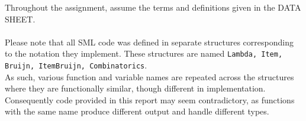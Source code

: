 \documentclass[11pt]{article}
\begin{document}
\maketitle


Throughout the assignment, assume the terms and definitions given in the DATA SHEET.
\\
\\
Please note that all SML code was defined in separate structures corresponding to the notation they implement. These structures are named \texttt{Lambda, Item, Bruijn, ItemBruijn, Combinatorics}. \\
As such, various function and variable names are repeated across the structures where they are functionally similar, though different in implementation. Consequently code provided in this report may seem contradictory, as functions with the same name produce different output and handle different types.
\end{document}
